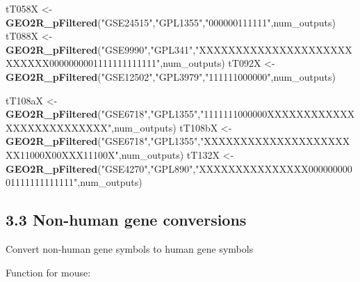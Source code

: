 \documentclass[
]{article}
\newenvironment{Shaded}{\begin{snugshade}}{\end{snugshade}}
\newcommand{\ControlFlowTok}[1]{\textcolor[rgb]{0.13,0.29,0.53}{\textbf{#1}}}
\newcommand{\DataTypeTok}[1]{\textcolor[rgb]{0.13,0.29,0.53}{#1}}
\newcommand{\DecValTok}[1]{\textcolor[rgb]{0.00,0.00,0.81}{#1}}
\newcommand{\KeywordTok}[1]{\textcolor[rgb]{0.13,0.29,0.53}{\textbf{#1}}}
\newcommand{\NormalTok}[1]{#1}
\newcommand{\OperatorTok}[1]{\textcolor[rgb]{0.81,0.36,0.00}{\textbf{#1}}}
\newcommand{\StringTok}[1]{\textcolor[rgb]{0.31,0.60,0.02}{#1}}
\begin{document}
\begin{Shaded}
\begin{Highlighting}[]
\NormalTok{tT058X <-}\StringTok{ }\KeywordTok{GEO2R_pFiltered}\NormalTok{(}\StringTok{"GSE24515"}\NormalTok{,}\StringTok{"GPL1355"}\NormalTok{,}\StringTok{"000000111111"}\NormalTok{,num_outputs)}
\NormalTok{tT088X <-}\StringTok{ }\KeywordTok{GEO2R_pFiltered}\NormalTok{(}\StringTok{"GSE9990"}\NormalTok{,}\StringTok{"GPL341"}\NormalTok{,}\StringTok{"XXXXXXXXXXXXXXXXXXXXXXXXXXX0000000001111111111111"}\NormalTok{,num_outputs)}
\NormalTok{tT092X <-}\StringTok{ }\KeywordTok{GEO2R_pFiltered}\NormalTok{(}\StringTok{"GSE12502"}\NormalTok{,}\StringTok{"GPL3979"}\NormalTok{,}\StringTok{"111111000000"}\NormalTok{,num_outputs)}

\NormalTok{tT108aX <-}\StringTok{ }\KeywordTok{GEO2R_pFiltered}\NormalTok{(}\StringTok{"GSE6718"}\NormalTok{,}\StringTok{"GPL1355"}\NormalTok{,}\StringTok{"1111111000000XXXXXXXXXXXXXXXXXXXXXXXXXX"}\NormalTok{,num_outputs)}
\NormalTok{tT108bX <-}\StringTok{ }\KeywordTok{GEO2R_pFiltered}\NormalTok{(}\StringTok{"GSE6718"}\NormalTok{,}\StringTok{"GPL1355"}\NormalTok{,}\StringTok{"XXXXXXXXXXXXXXXXXXXXXX11000X00XXX11100X"}\NormalTok{,num_outputs)}
\NormalTok{tT132X <-}\StringTok{ }\KeywordTok{GEO2R_pFiltered}\NormalTok{(}\StringTok{"GSE4270"}\NormalTok{,}\StringTok{"GPL890"}\NormalTok{,}\StringTok{"XXXXXXXXXXXXXXX00000000001111111111111"}\NormalTok{,num_outputs)}
\end{Highlighting}
\end{Shaded}

\hypertarget{non-human-gene-conversions}{%
\subsection{3.3 Non-human gene
conversions}\label{non-human-gene-conversions}}

Convert non-human gene symbols to human gene symbols

Function for mouse:

\begin{Shaded}
\end{Shaded}
\end{document}
